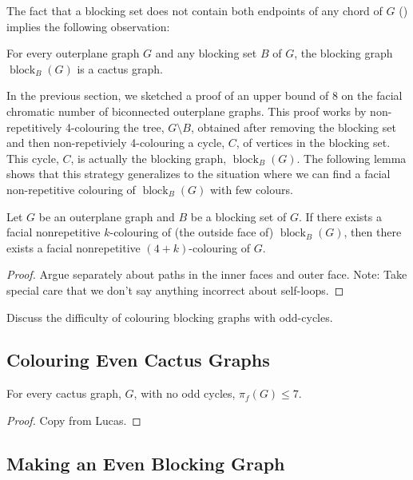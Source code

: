\documentclass{patmorin}
\DeclareMathOperator{\block}{block}
\begin{document}
The fact that a blocking set does not contain both endpoints of any
chord of $G$ () implies the following observation:

\begin{obs}
   For every outerplane graph $G$ and any blocking set $B$ of $G$,
   the blocking graph $\block_B(G)$ is a cactus graph.
\end{obs}

In the previous section, we sketched a proof of an upper bound of
8 on the facial chromatic number of biconnected outerplane graphs.
This proof works by non-repetitively 4-colouring the tree, $G\setminus
B$, obtained after removing the blocking set and then non-repetiviely
4-colouring a cycle, $C$, of vertices in the blocking set.  This cycle,
$C$, is actually the blocking graph, $\block_B(G)$.  The following lemma
shows that this strategy generalizes to the situation where we can find
a facial non-repetitive colouring of $\block_B(G)$ with few colours.

\begin{lem}\label{lem:hitting_plus_four}
  Let $G$ be an outerplane graph and $B$ be a blocking set of $G$. If
  there exists a facial nonrepetitive $k$-colouring of (the outside
  face of) $\block_{B}(G)$, then there exists a facial nonrepetitive
  $(4+k)$-colouring of $G$.
\end{lem}

\begin{proof}
  Argue separately about paths in the inner faces and outer face.  Note:
  Take special care that we don't say anything incorrect about self-loops.
\end{proof}

Discuss the difficulty of colouring blocking graphs with odd-cycles.

\subsection{Colouring Even Cactus Graphs}

\begin{lem}
   For every cactus graph, $G$, with no odd cycles, $\pi_f(G)\le 7$.
\end{lem}

\begin{proof}
   Copy from Lucas.
\end{proof}

\subsection{Making an Even Blocking Graph}
\end{document}
